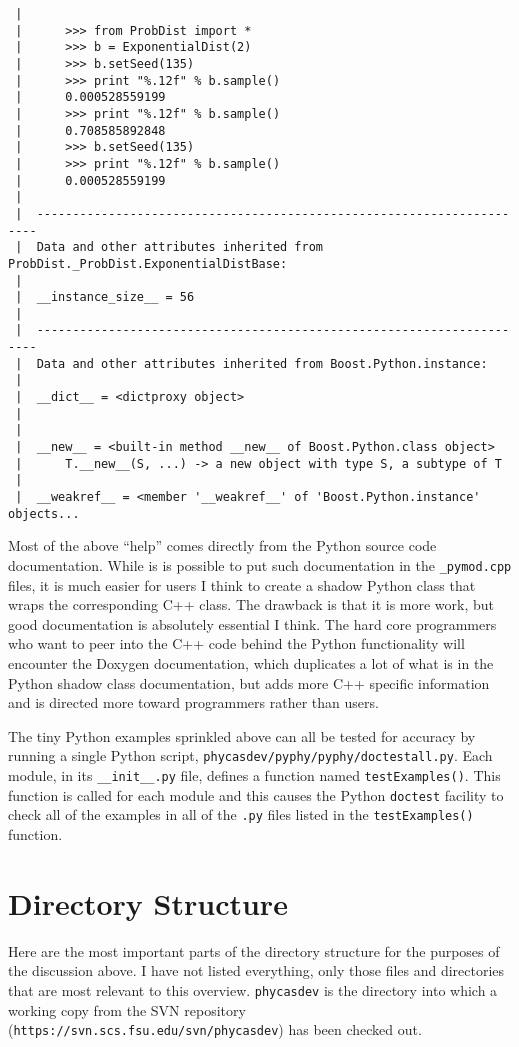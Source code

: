 \documentclass[10pt]{article}
\newcommand{\svnurl}{https://svn.scs.fsu.edu/svn/phycasdev}
\begin{document}
{\begin{verbatim}
 |
 |      >>> from ProbDist import *
 |      >>> b = ExponentialDist(2)
 |      >>> b.setSeed(135)
 |      >>> print "%.12f" % b.sample()
 |      0.000528559199
 |      >>> print "%.12f" % b.sample()
 |      0.708585892848
 |      >>> b.setSeed(135)
 |      >>> print "%.12f" % b.sample()
 |      0.000528559199
 |
 |  ----------------------------------------------------------------------
 |  Data and other attributes inherited from ProbDist._ProbDist.ExponentialDistBase:
 |
 |  __instance_size__ = 56
 |
 |  ----------------------------------------------------------------------
 |  Data and other attributes inherited from Boost.Python.instance:
 |
 |  __dict__ = <dictproxy object>
 |
 |
 |  __new__ = <built-in method __new__ of Boost.Python.class object>
 |      T.__new__(S, ...) -> a new object with type S, a subtype of T
 |
 |  __weakref__ = <member '__weakref__' of 'Boost.Python.instance' objects...
\end{verbatim}
}

Most of the above ``help'' comes directly from the Python source code documentation. While is is possible to put such documentation in the {\tt *\_pymod.cpp} files, it is much easier for users I think to create a shadow Python class that wraps the corresponding C++ class. The drawback is that it is more work, but good documentation is absolutely essential I think. The hard core programmers who want to peer into the C++ code behind the Python functionality will encounter the Doxygen documentation, which duplicates a lot of what is in the Python shadow class documentation, but adds more C++ specific information and is directed more toward programmers rather than users.

The tiny Python examples sprinkled above can all be tested for accuracy by running a single Python script, {\tt phycasdev/pyphy/pyphy/doctestall.py}. Each module, in its {\tt \_\_init\_\_.py} file, defines a function named {\tt testExamples()}. This function is called for each module and this causes the Python {\tt doctest} facility to check all of the examples in all of the {\tt .py} files listed in the {\tt testExamples()} function.

\section{Directory Structure}

Here are the most important parts of the directory structure for the purposes of the discussion above. I have not listed everything, only those files and directories that are most relevant to this overview. {\tt phycasdev} is the directory into which a working copy from the SVN repository ({\tt \svnurl}) has been checked out.
\end{document}
